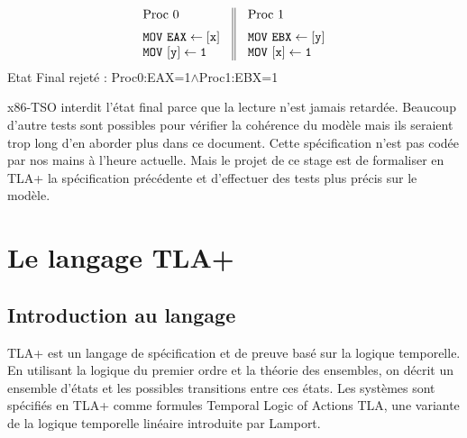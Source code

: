 \documentclass[12pt,a4paper]{article}
\begin{document}
\begin{center}
\[
\begin{array}{c||c}
  \begin{array}{l}
  	\vspace{0.2cm}
    \text{Proc 0} \hspace{1.0cm}\\
    \mathtt{MOV \text{ } EAX \leftarrow [x]} \\
    \mathtt{MOV \text{ } [y] \leftarrow 1} \\
  \end{array}&
  \begin{array}{l}
  \vspace{0.2cm}
   \text{Proc 1} \\
    \mathtt{MOV \text{ } EBX \leftarrow [y]} \\
    \mathtt{MOV \text{ } [x] \leftarrow 1} \\
  \end{array}
\end{array}
\]
Etat Final rejeté : Proc0:EAX=1$\land$Proc1:EBX=1
\end{center}  

x86-TSO interdit l'état final parce que la lecture n'est jamais retardée.
Beaucoup d'autre tests sont possibles pour vérifier la cohérence du modèle mais ils seraient trop long d'en aborder plus dans ce document. Cette spécification n'est pas codée par nos mains à l'heure actuelle. Mais le projet de ce stage est de formaliser en TLA+ la spécification précédente et d'effectuer des tests plus précis sur le modèle.

\section{Le langage TLA+}

\subsection{Introduction au langage}

TLA+ est un langage de spécification et de preuve basé sur la logique temporelle. En utilisant la logique du premier ordre et la théorie des ensembles, on décrit un ensemble d'états et les possibles transitions entre ces états. Les systèmes sont spécifiés en TLA+ comme formules Temporal Logic
of Actions TLA, une variante de la logique temporelle linéaire introduite par Lamport.
\end{document}

